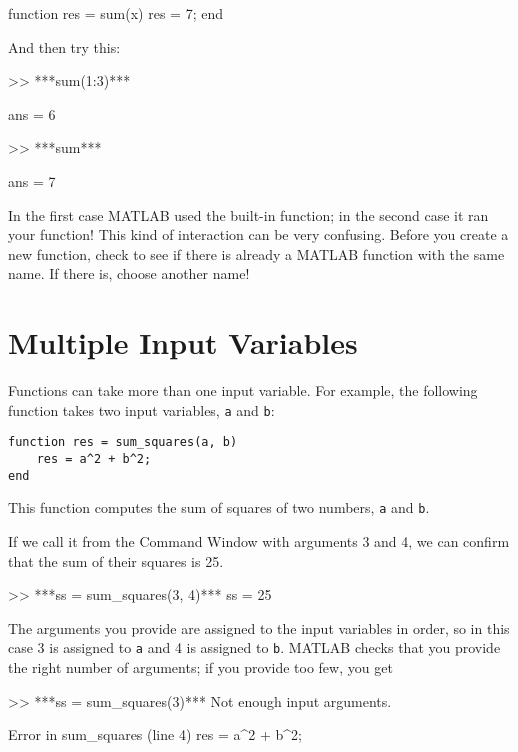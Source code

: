 
\begin{code}
function res = sum(x)
   res = 7;
end
\end{code}

And then try this:

\begin{code}
>> ***sum(1:3)***

ans = 6

>> ***sum***

ans = 7
\end{code}

In the first case MATLAB used the built-in function; in the second
case it ran your function!  This kind of interaction can be very
confusing.  Before you create a new function, check to see if there is
already a MATLAB function with the same name.  If there is, choose
another name!

\section{Multiple Input Variables}
\label{hypotenuse}


Functions can take more than one input variable.
For example, the following function takes two input variables,
\lstinline{a} and \lstinline{b}:

\begin{lstlisting}[caption={A function that computes the sum of squares of two numbers}, label={lst:hyp_function}]
function res = sum_squares(a, b)
    res = a^2 + b^2;
end
\end{lstlisting}
  
This function computes the sum of squares of two numbers, \lstinline{a}
and \lstinline{b}.

If we call it from the Command Window with arguments 3 and 4, we can
confirm that the sum of their squares is 25.

\begin{code}
>> ***ss = sum_squares(3, 4)***
ss = 25
\end{code}

The arguments you provide are assigned to the input variables in
order, so in this case 3 is assigned to \lstinline{a} and 4 is assigned to
\lstinline{b}.  MATLAB checks that you provide the right number of arguments;
if you provide too few, you get

\begin{code}
>> ***ss = sum_squares(3)***
Not enough input arguments.

Error in sum_squares (line 4)
    res = a^2 + b^2;
\end{code}

